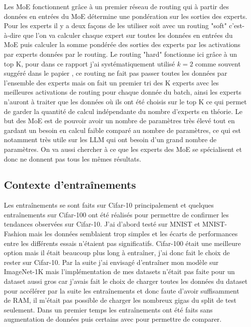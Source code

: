 \documentclass{article}
\begin{document}
Les MoE fonctionnent grâce à un premier réseau de routing qui à partir des données en entrées du MoE détermine une pondération sur les sorties des experts. Pour les experts il y a deux façons de les utiliser soit avec un routing "soft" c'est-à-dire que l'on va calculer chaque expert sur toutes les données en entrées du MoE puis calculer la somme pondérée des sorties des experts par les activations par experts données par le routing. Le routing "hard" fonctionne ici grâce à un top K, pour dans ce rapport j'ai systématiquement utilisé $ k=2 $ comme souvent suggéré dans le papier \cite{paper2}, ce routing ne fait pas passer toutes les données par l'ensemble des experts mais on fait un premier tri des K experts avec les meilleures activations de routing pour chaque donnée du batch, ainsi les experts n'auront à traiter que les données où ils ont été choisis sur le top K ce qui permet de garder la quantité de calcul indépendante du nombre d'experts en théorie. Le but des MoE est de pouvoir avoir un nombre de paramètres très élevé tout en gardant un besoin en calcul faible comparé au nombre de paramètres, ce qui est notamment très utile sur les LLM qui ont besoin d'un grand nombre de paramètres. On va aussi chercher à ce que les experts des MoE se spécialisent et donc ne donnent pas tous les mêmes résultats.


\subsection{Contexte d'entraînements}

Les entraînements se sont faits sur Cifar-10 principalement et quelques entraînements sur Cifar-100 ont été réalisés pour permettre de confirmer les tendances observées sur Cifar-10. J'ai d'abord testé sur MNIST et MNIST-Fashion mais les données semblaient trop simples et les écarts de performances entre les différents essais n'étaient pas significatifs. Cifar-100 était une meilleure option mais il était beaucoup plus long à entraîner, j'ai donc fait le choix de rester sur Cifar-10. Par la suite j'ai envisagé d'entraîner mon modèle sur ImageNet-1K mais l'implémentation de mes datasets n'était pas faite pour un dataset aussi gros car j'avais fait le choix de charger toutes les données du dataset pour accélérer par la suite les entraînements et donc faute d'avoir suffisamment de RAM, il m'était pas possible de charger les nombreux gigas du split de test seulement. Dans un premier temps les entraînements ont été faits sans augmentation de données puis certains avec pour permettre de comparer.
\end{document}
